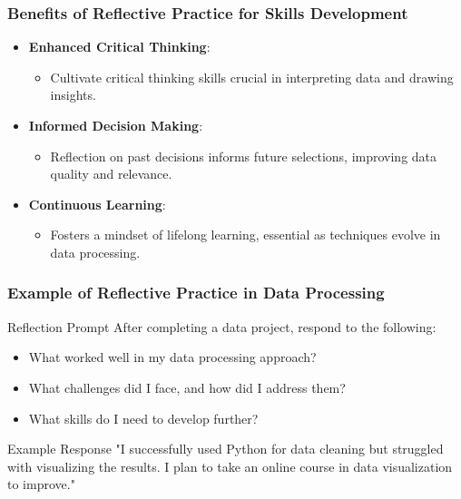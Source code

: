 \documentclass[aspectratio=169]{beamer}
\begin{document}
\begin{frame}[fragile]
    \frametitle{Benefits of Reflective Practice for Skills Development}
    \begin{itemize}
        \item \textbf{Enhanced Critical Thinking}:
            \begin{itemize}
                \item Cultivate critical thinking skills crucial in interpreting data and drawing insights.
            \end{itemize}
        \item \textbf{Informed Decision Making}:
            \begin{itemize}
                \item Reflection on past decisions informs future selections, improving data quality and relevance.
            \end{itemize}
        \item \textbf{Continuous Learning}:
            \begin{itemize}
                \item Fosters a mindset of lifelong learning, essential as techniques evolve in data processing.
            \end{itemize}
    \end{itemize}
\end{frame}

\begin{frame}[fragile]
    \frametitle{Example of Reflective Practice in Data Processing}
    \begin{block}{Reflection Prompt}
        After completing a data project, respond to the following:
        \begin{itemize}
            \item What worked well in my data processing approach?
            \item What challenges did I face, and how did I address them?
            \item What skills do I need to develop further?
        \end{itemize}
    \end{block}
    \begin{block}{Example Response}
        "I successfully used Python for data cleaning but struggled with visualizing the results. I plan to take an online course in data visualization to improve."
    \end{block}
\end{frame}
\end{document}
